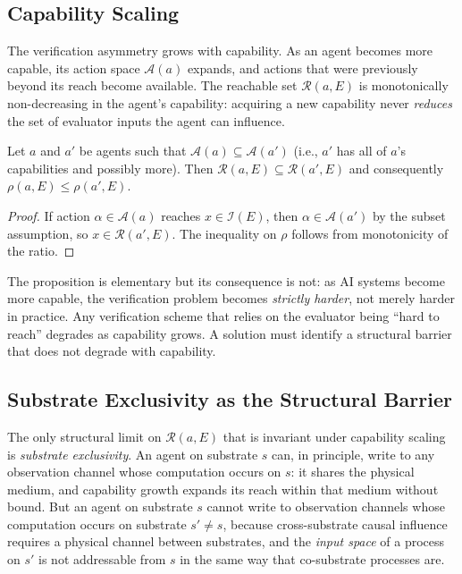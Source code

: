 \subsection{Capability Scaling}
\label{sec:capability_scaling}

The verification asymmetry grows with capability.  As an agent becomes
more capable, its action space $\mathcal{A}(a)$ expands, and actions
that were previously beyond its reach become available.  The reachable
set $\mathcal{R}(a, E)$ is monotonically non-decreasing in the agent's
capability: acquiring a new capability never \emph{reduces} the set of
evaluator inputs the agent can influence.

\begin{proposition}
\label{prop:monotonicity}
Let $a$ and $a'$ be agents such that $\mathcal{A}(a) \subseteq
\mathcal{A}(a')$ (i.e., $a'$ has all of $a$'s capabilities and
possibly more).  Then $\mathcal{R}(a, E) \subseteq \mathcal{R}(a', E)$
and consequently $\rho(a, E) \leq \rho(a', E)$.
\end{proposition}

\begin{proof}
If action $\alpha \in \mathcal{A}(a)$ reaches $x \in \mathcal{I}(E)$,
then $\alpha \in \mathcal{A}(a')$ by the subset assumption, so $x \in
\mathcal{R}(a', E)$.  The inequality on $\rho$ follows from monotonicity
of the ratio.
\end{proof}

The proposition is elementary but its consequence is not: as AI systems
become more capable, the verification problem becomes \emph{strictly
harder}, not merely harder in practice.  Any verification scheme that
relies on the evaluator being ``hard to reach'' degrades as capability
grows.  A solution must identify a structural barrier that does not
degrade with capability.

\subsection{Substrate Exclusivity as the Structural Barrier}
\label{sec:substrate_barrier}

The only structural limit on $\mathcal{R}(a, E)$ that is invariant
under capability scaling is \emph{substrate exclusivity}.  An agent on
substrate $s$ can, in principle, write to any observation channel whose
computation occurs on $s$: it shares the physical medium, and capability
growth expands its reach within that medium without bound.  But an agent
on substrate $s$ cannot write to observation channels whose computation
occurs on substrate $s' \neq s$, because cross-substrate causal
influence requires a physical channel between substrates, and the
\emph{input space} of a process on $s'$ is not addressable from $s$ in
the same way that co-substrate processes are.

